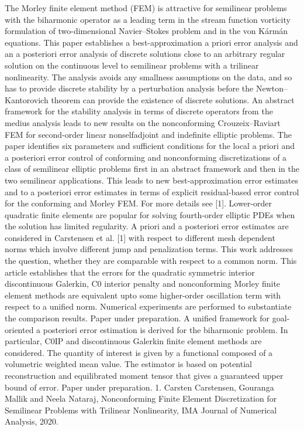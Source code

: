 The Morley finite element method (FEM) is attractive for semilinear problems with the biharmonic operator as a leading term in the stream function vorticity formulation of two-dimensional Navier–Stokes problem and in the von Kármán equations. This paper establishes a best-approximation a priori error analysis and an a posteriori error analysis of discrete solutions close to an arbitrary regular solution on the continuous level to semilinear problems with a trilinear nonlinearity. The analysis avoids any smallness assumptions on the data, and so has to provide discrete stability by a perturbation analysis before the Newton–Kantorovich theorem can provide the existence of discrete solutions. An abstract framework for the stability analysis in terms of discrete operators from the medius analysis leads to new results on the nonconforming Crouzeix–Raviart FEM for second-order linear nonselfadjoint and indefinite elliptic problems. The paper identifies six parameters and sufficient conditions for the local a priori and a posteriori error control of conforming and nonconforming discretizations of a class of semilinear elliptic problems first in an abstract framework and then in the two semilinear applications. This leads to new best-approximation error estimates and to a posteriori error estimates in terms of explicit residual-based error control for the conforming and Morley FEM. For more details see [1].  Lower-order quadratic finite elements are popular for solving fourth-order elliptic PDEs when the solution has limited regularity.  A priori and a posteriori error estimates are considered in Carstensen et al. [1] with respect to different mesh dependent norms which involve different jump and penalization terms. This work addresses the question, whether they are comparable with respect to a common norm. This article  establishes that the errors for the quadratic symmetric interior discontinuous Galerkin, C0 interior penalty and nonconforming Morley finite element methods are equivalent upto some higher-order oscillation term with respect to a unified norm. Numerical experiments are performed to substantiate the comparison results. Paper under preparation.  A unified framework for goal-oriented a posteriori error estimation is derived for the biharmonic problem. In particular, C0IP and discontinuous Galerkin finite element methods are considered. The quantity of interest is given by a functional composed of a volumetric weighted mean value. The estimator is based on potential reconstruction and equilibrated moment tensor that gives a  guaranteed upper bound of error. Paper under preparation.  1. Carsten Carstensen, Gouranga Mallik and Neela Nataraj, Nonconforming Finite Element Discretization for Semilinear Problems with Trilinear Nonlinearity, IMA Journal of Numerical Analysis, 2020.


